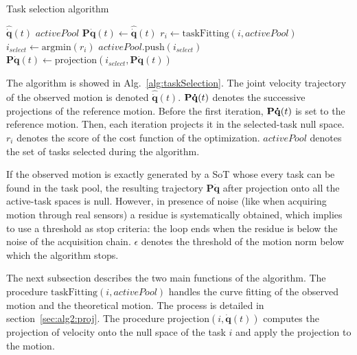 \documentclass[letterpaper, 10pt, conference]{ieeeconf}      %
\begin{document}
\begin{algorithm}[t]
  \caption{Task selection algorithm}
  \label{alg:taskSelection}
\begin{algorithmic}[1]
  \STATE \shINPUT $\mathbf{\hat{\dot{q}}}(t)$
\STATE \shOUTPUT $activePool$
\STATE $\mathbf{P}\mathbf{\dot{q}}(t)\gets \mathbf{\hat{\dot{q}}}(t)$
    \STATE $r_i \gets \mathrm{taskFitting}(i, activePool)$
  \ENDFOR
  \STATE $i_{select} \gets \mathrm{argmin}(r_i)$
  \STATE $activePool.\mathrm{push}(i_{select})$
  \STATE $\mathbf{P}\mathbf{\dot{q}}(t) \gets \mathrm{projection}(i_{select}, \mathbf{P}\mathbf{\dot{q}}(t))$
\ENDWHILE
\end{algorithmic}
\end{algorithm}
The algorithm is showed in Alg.~\ref{alg:taskSelection}.
The joint velocity trajectory
of the observed motion is denoted $\mathbf{\hat{\dot{q}}}(t)$.
${\mathbf{P\dot{q}}}(t)$ denotes the successive projections of the reference
motion. Before the first iteration, ${\mathbf{P\dot{q}}}(t)$ is set to the reference motion.
Then, each iteration projects it in the selected-task null space.
$r_i$ denotes the score of the cost function of the optimization. $activePool$ denotes
the set of tasks selected during the algorithm. 

If the observed motion is exactly generated by a SoT whose every task can be 
found in the task pool, the resulting trajectory $\mathbf{P\dot{q}}$ after projection
onto all the active-task spaces is null. However, in presence of noise (like when
acquiring motion through real sensors)
a residue is systematically obtained, which implies to use a threshold
as stop criteria: the loop ends when the residue is below the noise of
the acquisition chain. $\epsilon$ denotes the threshold
of the motion norm below which the algorithm stops.

The next subsection describes the two main functions of the algorithm.
The procedure $\mathrm{taskFitting}(i, activePool)$ handles the curve fitting
of the observed motion and the theoretical motion. The process is detailed in section~\ref{sec:alg2:proj}.
The procedure $\mathrm{projection}(i, \mathbf{\dot{q}}(t))$ computes the projection of
velocity onto the null space of the task $i$ and apply the projection to the motion.
\end{document}
